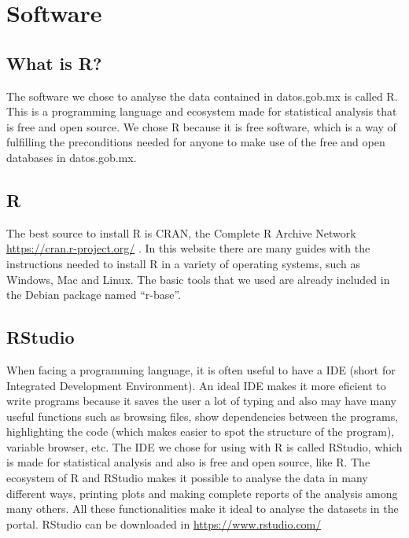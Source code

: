 \documentclass[]{book}
\begin{document}
\section{Software}\label{software}

\subsection{What is R?}\label{what-is-r}

The software we chose to analyse the data contained in datos.gob.mx is
called R. This is a programming language and ecosystem made for
statistical analysis that is free and open source. We chose R because it
is free software, which is a way of fulfilling the preconditions needed
for anyone to make use of the free and open databases in datos.gob.mx.

\subsection{R}\label{r}

The best source to install R is CRAN, the Complete R Archive Network
\url{https://cran.r-project.org/} . In this website there are many
guides with the instructions needed to install R in a variety of
operating systems, such as Windows, Mac and Linux. The basic tools that
we used are already included in the Debian package named ``r-base''.

\subsection{RStudio}\label{rstudio}

When facing a programming language, it is often useful to have a IDE
(short for Integrated Development Environment). An ideal IDE makes it
more eficient to write programs because it saves the user a lot of
typing and also may have many useful functions such as browsing files,
show dependencies between the programs, highlighting the code (which
makes easier to spot the structure of the program), variable browser,
etc. The IDE we chose for using with R is called RStudio, which is made
for statistical analysis and also is free and open source, like R. The
ecosystem of R and RStudio makes it possible to analyse the data in many
different ways, printing plots and making complete reports of the
analysis among many others. All these functionalities make it ideal to
analyse the datasets in the portal. RStudio can be downloaded in
\url{https://www.rstudio.com/}
\end{document}
